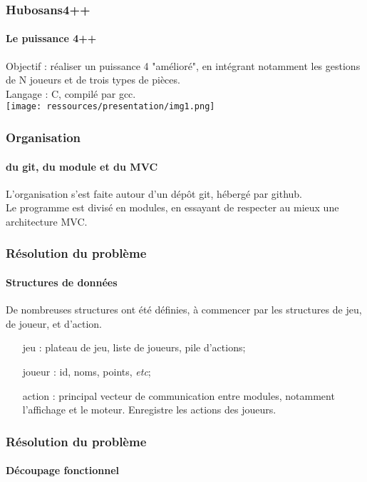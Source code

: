 \documentclass{beamer}
\begin{document}
    \begin{frame}
    \frametitle{Hubosans4++}
    \framesubtitle{Le puissance 4++}
        Objectif : réaliser un puissance 4 "amélioré", 
            en intégrant notamment les gestions de N joueurs 
            et de trois types de pièces. \\     
        Langage : C, compilé par gcc. \\
        \texttt{[image: ressources/presentation/img1.png]}
    \end{frame}


    \begin{frame}
    \frametitle{Organisation}
    \framesubtitle{du git, du module et du MVC}
        L'organisation s'est faite autour d'un dépôt git, 
            hébergé par github. \\ 
        Le programme est divisé en modules, en essayant 
            de respecter au mieux une architecture MVC.
    \end{frame}


    \begin{frame}
    \frametitle{Résolution du problème}
    \framesubtitle{Structures de données}
        De nombreuses structures ont été définies, à commencer 
            par les structures de jeu, de joueur, et d'action. \\
        \begin{itemize}
        \item[jeu :] plateau de jeu, liste de joueurs, pile d'actions;\\
        \item[joueur :] id, noms, points, \textit{etc};\\
        \item[action :] principal vecteur de communication entre modules, 
            notamment l'affichage et le moteur. Enregistre les actions 
            des joueurs.
        \end{itemize}
    \end{frame}


    \begin{frame}
    \frametitle{Résolution du problème}
    \framesubtitle{Découpage fonctionnel}
    \end{frame}
\end{document}

